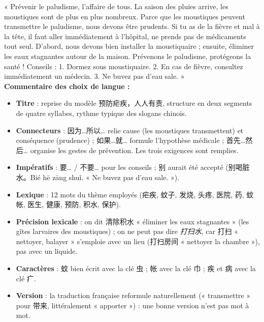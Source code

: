 \documentclass[11pt]{article}
\newcounter{popsec}
\newcounter{popsub}
\newcommand{\courssub}[1]{%
  \stepcounter{popsub}%
  \par\vspace{9pt}\noindent{\popxbold\fontsize{11.5}{13}\selectfont\color{popink}{\color{poporange}\thepopsec.\thepopsub}\hspace{6pt}#1}\par\nopagebreak\vspace{4pt}
}
\begin{document}
\begin{exoresolu}
« Prévenir le paludisme, l'affaire de tous. La saison des pluies arrive, les moustiques sont de plus en plus nombreux. Parce que les moustiques peuvent transmettre le paludisme, nous devons être prudents. Si tu as de la fièvre et mal à la tête, il faut aller immédiatement à l'hôpital, ne prends pas de médicaments tout seul. D'abord, nous devons bien installer la moustiquaire ; ensuite, éliminer les eaux stagnantes autour de la maison. Prévenons le paludisme, protégeons la santé ! Conseils : 1. Dormez sous moustiquaire. 2. En cas de fièvre, consultez immédiatement un médecin. 3. Ne buvez pas d'eau sale. »\\[6pt]
\textbf{Commentaire des choix de langue :}
\begin{itemize}
\item \textbf{Titre} : reprise du modèle 预防疟疾，人人有责, structure en deux segments de quatre syllabes, rythme typique des slogans chinois.
\item \textbf{Connecteurs} : 因为…所以… relie cause (les moustiques transmettent) et conséquence (prudence) ; 如果…就… formule l'hypothèse médicale ; 首先…然后… organise les gestes de prévention. Les trois exigences sont remplies.
\item \textbf{Impératifs} : 要… / 不要… pour les conseils ; 别 aurait été accepté (别喝脏水。Bié hē zāng shuǐ. « Ne buvez pas d'eau sale. »).
\item \textbf{Lexique} : 12 mots du thème employés (疟疾, 蚊子, 发烧, 头疼, 医院, 药, 蚊帐, 医生, 健康, 预防, 积水, 保护).
\item \textbf{Précision lexicale} : on dit 清除积水 « éliminer les eaux stagnantes » (les gîtes larvaires des moustiques) ; on ne peut pas dire \emph{打扫水}, car 打扫 « nettoyer, balayer » s'emploie avec un lieu (打扫房间 « nettoyer la chambre »), pas avec un liquide.
\item \textbf{Caractères} : 蚊 bien écrit avec la clé 虫 ; 帐 avec la clé 巾 ; 疾 et 病 avec la clé 疒.
\item \textbf{Version} : la traduction française reformule naturellement (« transmettre » pour 带来, littéralement « apporter ») : une bonne version n'est pas mot à mot.
\end{itemize}
\end{exoresolu}

\courssub{Bilan de l'activité}
\end{document}
